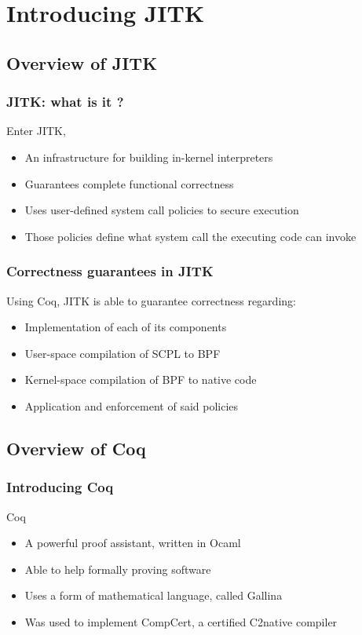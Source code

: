 \documentclass{beamer}
\begin{document}

\section{Introducing JITK} 

\subsection{Overview of JITK}

\begin{frame}\frametitle{JITK: what is it ?}
Enter JITK,
\begin{itemize}[<+->]
	\item An infrastructure for building in-kernel interpreters
	\item Guarantees complete functional correctness
	\item Uses user-defined system call policies to secure execution
	\item Those policies define what system call the executing code can invoke
 \end{itemize}
\end{frame}

\begin{frame}\frametitle{Correctness guarantees in JITK}
Using Coq, JITK is able to guarantee correctness regarding:
\begin{itemize}[<+->]
	\item Implementation of each of its components
	\item User-space compilation of SCPL to BPF
	\item Kernel-space compilation of BPF to native code
	\item Application and enforcement of said policies
 \end{itemize}
\end{frame}

\subsection{Overview of Coq}

\begin{frame}\frametitle{Introducing Coq}
Coq
\begin{itemize}[<+->]
	\item A powerful proof assistant, written in Ocaml
	\item Able to help formally proving software
	\item Uses a form of mathematical language, called Gallina
	\item Was used to implement CompCert, a certified C2native compiler
 \end{itemize}
\end{frame}
\end{document}
